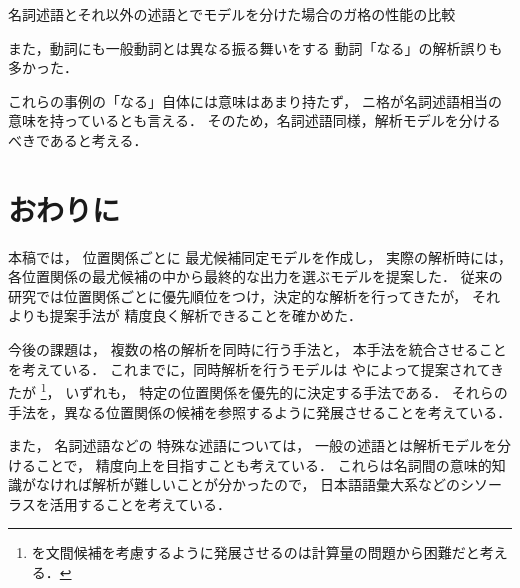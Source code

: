 \documentclass[japanese]{jnlp_1.4}
\let\underline
\newcommand{\newcite}[1]{}
\newcommand{\enumsentence}[2]{}
\begin{document}
\begin{table}[t]
\caption{名詞述語とそれ以外の述語とでモデルを分けた場合のガ格の性能の比較}
\label{tbl:result-copula-ga}

\end{table}





また，動詞にも一般動詞とは異なる振る舞いをする
動詞「なる」の解析誤りも多かった．


\enumsentence{
山花氏らにとっては、社会党が離脱を認めるか\underline{どうか}$_{ガ}$が、最初の\underline{関門}$_{ニ}$と\underline{なる}。
}{error-naru1}

\enumsentence{
\underline{長さ}$_{ガ}$ \underline{\mbox{40 メートル}}$_{ニ}$にも\underline{なる}3 両編成の大型トラック、ロードトレインに便乗して大乾燥地帯を行く蛭子。
}{error-naru2}

\enumsentence{
福井市の中心から足羽川を上流へ十キロたどると、\underline{そこ}$_{ガ}$はもうひなびた農村の\underline{たたずまい}$_{ニ}$と\underline{なる}。
}{error-naru3}

これらの事例の「なる」自体には意味はあまり持たず，
ニ格が名詞述語相当の意味を持っているとも言える．
そのため，名詞述語同様，解析モデルを分けるべきであると考える．


\section{おわりに}

本稿では，
位置関係ごとに
最尤候補同定モデルを作成し，
実際の解析時には，
各位置関係の最尤候補の中から最終的な出力を選ぶモデルを提案した．
従来の研究では位置関係ごとに優先順位をつけ，決定的な解析を行ってきたが，
それよりも提案手法が
精度良く解析できることを確かめた．


今後の課題は，
複数の格の解析を同時に行う手法と，
本手法を統合させることを考えている．
これまでに，同時解析を行うモデルは
やによって提案されてきたが
\footnote{を文間候補を考慮するように発展させるのは計算量の問題から困難だと考える．}，
いずれも，
特定の位置関係を優先的に決定する手法である．
それらの手法を，異なる位置関係の候補を参照するように発展させることを考えている．


また，
名詞述語などの
特殊な述語については，
一般の述語とは解析モデルを分けることで，
精度向上を目指すことも考えている．
これらは名詞間の意味的知識がなければ解析が難しいことが分かったので，
日本語語彙大系などのシソーラスを活用することを考えている．
\end{document}

